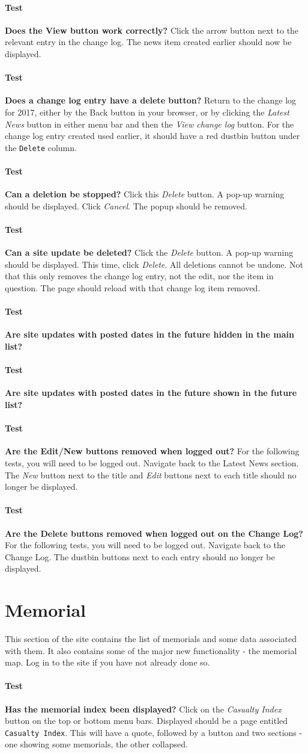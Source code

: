 \documentclass[12pt]{article}
\newcounter{Test}
\newcommand{\test}[1]{%
\stepcounter{Test}%
\paragraph{Test \theTest} \textbf{#1} }
\begin{document}
\test{Does the View button work correctly?}
Click the arrow button next to the relevant entry in the change log. The news item created earlier should now be displayed.

\test{Does a change log entry have a delete button?}
Return to the change log for 2017, either by the Back button in your browser, or by clicking the \textit{Latest News} button in either menu bar and then the \textit{View change log} button. For the change log entry created used earlier, it should have a red dustbin button under the \texttt{Delete} column.

\test{Can a deletion be stopped?}
Click this \textit{Delete} button. A pop-up warning should be displayed. Click \textit{Cancel}. The popup should be removed.

\test{Can a site update be deleted?}
Click the \textit{Delete} button. A pop-up warning should be displayed. This time, click \textit{Delete}. All deletions cannot be undone. Not that this only removes the change log entry, not the edit, nor the item in question. The page should reload with that change log item removed.

\test{Are site updates with posted dates in the future hidden in the main list?}

\test{Are site updates with posted dates in the future shown in the future list?}

\test{Are the Edit/New buttons removed when logged out?}
For the following tests, you will need to be logged out. Navigate back to the Latest News section. The \textit{New} button next to the title and \textit{Edit} buttons next to each title should no longer be displayed.

\test{Are the Delete buttons removed when logged out on the Change Log?}
For the following tests, you will need to be logged out. Navigate back to the Change Log. The dustbin buttons next to each entry should no longer be displayed.

\section{Memorial}\label{sec:memorial}
This section of the site contains the list of memorials and some data associated with them. It also contains some of the major new functionality - the memorial map. Log in to the site if you have not already done so.

\test{Has the memorial index been displayed?}
Click on the \textit{Casualty Index} button on the top or bottom menu bars. Displayed should be a page entitled \texttt{Casualty Index}. This will have a quote, followed by a button and two sections - one showing some memorials, the other collapsed.
\end{document}
